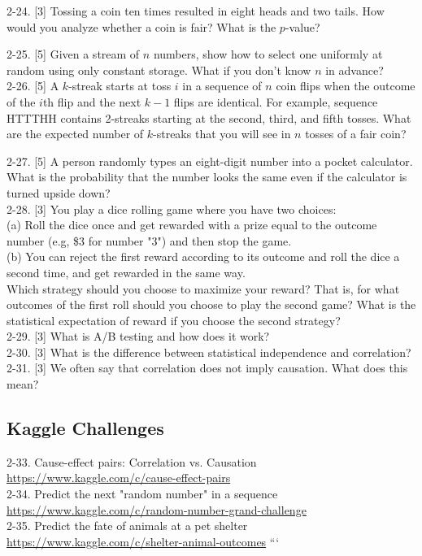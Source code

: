 \documentclass[10pt]{article}
\begin{document}
2-24. [3] Tossing a coin ten times resulted in eight heads and two tails. How would you analyze whether a coin is fair? What is the $p$-value?

2-25. [5] Given a stream of $n$ numbers, show how to select one uniformly at random using only constant storage. What if you don't know $n$ in advance?\\[0pt]

2-26. [5] A $k$-streak starts at toss $i$ in a sequence of $n$ coin flips when the outcome of the $i$th flip and the next $k-1$ flips are identical. For example, sequence HTTTHH contains 2-streaks starting at the second, third, and fifth tosses. What are the expected number of $k$-streaks that you will see in $n$ tosses of a fair coin?

2-27. [5] A person randomly types an eight-digit number into a pocket calculator. What is the probability that the number looks the same even if the calculator is turned upside down?\\[0pt]

2-28. [3] You play a dice rolling game where you have two choices:\\
(a) Roll the dice once and get rewarded with a prize equal to the outcome number (e.g, \$3 for number "3") and then stop the game.\\
(b) You can reject the first reward according to its outcome and roll the dice a second time, and get rewarded in the same way.\\

Which strategy should you choose to maximize your reward? That is, for what outcomes of the first roll should you choose to play the second game? What is the statistical expectation of reward if you choose the second strategy?\\[0pt]

2-29. [3] What is A/B testing and how does it work?\\[0pt]
2-30. [3] What is the difference between statistical independence and correlation?\\[0pt]
2-31. [3] We often say that correlation does not imply causation. What does this mean?

\subsection{Kaggle Challenges}
2-33. Cause-effect pairs: Correlation vs. Causation\\
\href{https://www.kaggle.com/c/cause-effect-pairs}{https://www.kaggle.com/c/cause-effect-pairs}\\
2-34. Predict the next "random number" in a sequence\\
\href{https://www.kaggle.com/c/random-number-grand-challenge}{https://www.kaggle.com/c/random-number-grand-challenge}\\
2-35. Predict the fate of animals at a pet shelter\\
\href{https://www.kaggle.com/c/shelter-animal-outcomes}{https://www.kaggle.com/c/shelter-animal-outcomes}
```
\end{document}
